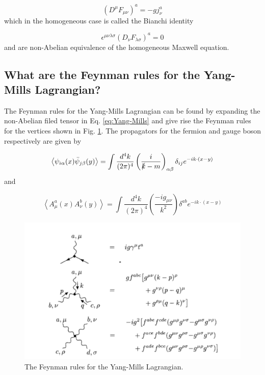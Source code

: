 \documentclass[paper=a4, fontsize=11pt]{scrartcl} %
\numberwithin{equation}{section} %
\numberwithin{figure}{section} %
\numberwithin{table}{section} %
\newcommand{\average}[1]{\ensuremath{\left\langle #1 \right\rangle}}
\newcommand{\parentheses}[1]{\ensuremath{\left( #1 \right)}}
\begin{document}
\begin{equation}
\parentheses{D^{\mu} F_{\mu\nu}}^a = -g j_{\nu}^{a}
\end{equation}
which in the homogeneous case is called the Bianchi identity

\begin{equation}
\epsilon^{\mu\nu\lambda\sigma} \parentheses{D_{\nu} F_{\lambda\sigma}}^a = 0
\end{equation}
and are non-Abelian equivalence of the homogeneous Maxwell equation.

\subsection{What are the Feynman rules for the Yang-Mills Lagrangian?}
The Feynman rules for the Yang-Mills Lagrangian can be found by expanding the non-Abelian filed tensor in Eq. \eqref{eq:Yang-Mills} and give rise the Feynman rules for the vertices shown in Fig. \ref{fig:Yang-Mills_Feynman_Rules}. The propagators for the fermion and gauge boson respectively are given by

\begin{equation}
\average{\psi_{i\alpha}(x)\bar{\psi}_{j\beta}(y)} = \int \dfrac{d^4k}{(2\pi)^ 4} \parentheses{ \dfrac{i}{\slashed{k} - m}}_{\alpha\beta} \delta_{ij}e^{-ik\cdot (x-y)}
\end{equation}
and 

\begin{equation}
\average{A_{\mu}^{a}(x)A_{\nu}^{b}(y)} = \int \dfrac{d^4k}{(2\pi)^ 4} \parentheses{ \dfrac{-ig_{\mu\nu}}{k^2}} \delta^{ab}e^{-ik\cdot (x-y)}
\end{equation}

\begin{figure}[hbtp]
\centering
\includegraphics[width=\textwidth]{Non-abelian_Feynman_Rules.png}
\caption{The Feynman rules for the Yang-Mills Lagrangian.}
\label{fig:Yang-Mills_Feynman_Rules}
\end{figure}
\end{document}
